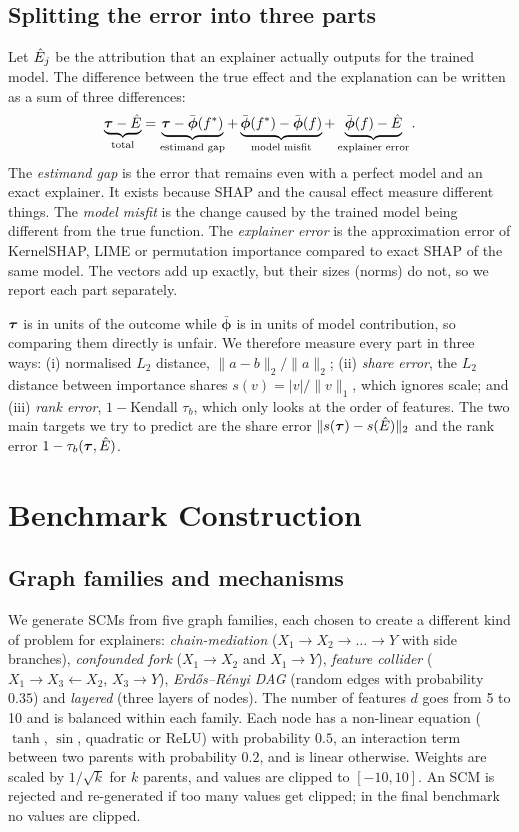\subsection{Splitting the error into three parts}
Let $\hat{E}_j$ be the attribution that an explainer actually outputs for the trained model. The difference between the true effect and the explanation can be written as a sum of three differences:
\begin{equation}
\underbrace{\boldsymbol{\tau} - \hat{E}}_{\text{total}} = \underbrace{\boldsymbol{\tau} - \bar{\boldsymbol\phi}(f^*)}_{\text{estimand gap}} + \underbrace{\bar{\boldsymbol\phi}(f^*) - \bar{\boldsymbol\phi}(f)}_{\text{model misfit}} + \underbrace{\bar{\boldsymbol\phi}(f) - \hat{E}}_{\text{explainer error}}.
\label{eq:decomp}
\end{equation}
The \emph{estimand gap} is the error that remains even with a perfect model and an exact explainer. It exists because SHAP and the causal effect measure different things. The \emph{model misfit} is the change caused by the trained model being different from the true function. The \emph{explainer error} is the approximation error of KernelSHAP, LIME or permutation importance compared to exact SHAP of the same model. The vectors add up exactly, but their sizes (norms) do not, so we report each part separately.

$\boldsymbol{\tau}$ is in units of the outcome while $\bar{\boldsymbol\phi}$ is in units of model contribution, so comparing them directly is unfair. We therefore measure every part in three ways: (i) normalised $L_2$ distance, $\|a-b\|_2 / \|a\|_2$; (ii) \emph{share error}, the $L_2$ distance between importance shares $s(v) = |v|/\|v\|_1$, which ignores scale; and (iii) \emph{rank error}, $1 - \text{Kendall } \tau_b$, which only looks at the order of features. The two main targets we try to predict are the share error $\|s(\boldsymbol{\tau}) - s(\hat{E})\|_2$ and the rank error $1-\tau_b(\boldsymbol{\tau}, \hat{E})$.

\section{Benchmark Construction}
\subsection{Graph families and mechanisms}
We generate SCMs from five graph families, each chosen to create a different kind of problem for explainers: \emph{chain-mediation} ($X_1 \to X_2 \to \dots \to Y$ with side branches), \emph{confounded fork} ($X_1 \to X_2$ and $X_1 \to Y$), \emph{feature collider} ($X_1 \to X_3 \leftarrow X_2$, $X_3 \to Y$), \emph{Erd\H{o}s--R\'enyi DAG} (random edges with probability $0.35$) and \emph{layered} (three layers of nodes). The number of features $d$ goes from 5 to 10 and is balanced within each family. Each node has a non-linear equation ($\tanh$, $\sin$, quadratic or ReLU) with probability $0.5$, an interaction term between two parents with probability $0.2$, and is linear otherwise. Weights are scaled by $1/\sqrt{k}$ for $k$ parents, and values are clipped to $[-10, 10]$. An SCM is rejected and re-generated if too many values get clipped; in the final benchmark no values are clipped.

